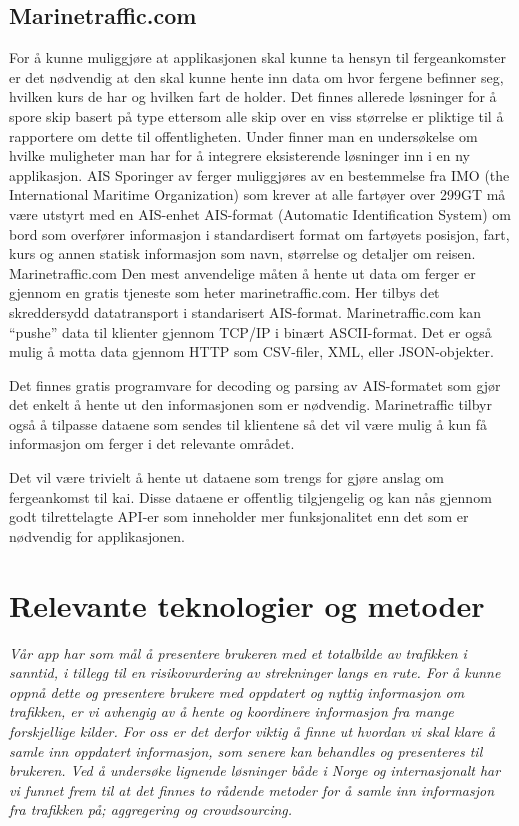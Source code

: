 \documentclass[a4paper,norsk,oneside]{book}
\begin{document}
\section{Marinetraffic.com}
For å kunne muliggjøre at applikasjonen skal kunne ta hensyn til fergeankomster er det nødvendig at den skal kunne hente inn data om hvor fergene befinner seg, hvilken kurs de har og hvilken fart de holder. Det finnes allerede løsninger for å spore skip basert på type ettersom alle skip over en viss størrelse er pliktige til å rapportere om dette til offentligheten. Under finner man en undersøkelse om hvilke muligheter man har for å integrere eksisterende løsninger inn i en ny applikasjon.
AIS
Sporinger av ferger muliggjøres av en bestemmelse fra IMO (the International Maritime Organization) som krever at alle fartøyer over 299GT må være utstyrt med en AIS-enhet AIS-format (Automatic Identification System) om bord som overfører informasjon i standardisert format om fartøyets posisjon, fart, kurs og annen statisk informasjon som navn, størrelse og detaljer om reisen.\cite{laws}
Marinetraffic.com
Den mest anvendelige måten å hente ut data om ferger er gjennom en gratis tjeneste som heter marinetraffic.com. Her tilbys det skreddersydd datatransport i standarisert AIS-format. Marinetraffic.com kan “pushe” data til klienter gjennom TCP/IP i binært ASCII-format. Det er også mulig å motta data gjennom HTTP som CSV-filer, XML, eller JSON-objekter. \cite{mar}

Det finnes gratis programvare for decoding og parsing av AIS-formatet som gjør det enkelt å hente ut den informasjonen som er nødvendig. Marinetraffic tilbyr også å tilpasse dataene som sendes til klientene så det vil være mulig å kun få informasjon om ferger i det relevante området.

Det vil være trivielt å hente ut dataene som trengs for gjøre anslag om fergeankomst til kai. Disse dataene er offentlig tilgjengelig og kan nås gjennom godt tilrettelagte API-er som inneholder mer funksjonalitet enn det som er nødvendig for applikasjonen.


\chapter{Relevante teknologier og metoder}
\label{cha:ResearchAndResults}

{\it Vår app har som mål å presentere brukeren med et totalbilde av trafikken i sanntid, i tillegg til en risikovurdering av strekninger langs en rute. For å kunne oppnå dette og presentere brukere med oppdatert og nyttig informasjon om trafikken, er vi avhengig av å hente og koordinere informasjon fra mange forskjellige kilder. For oss er det derfor viktig å finne ut hvordan vi skal klare å samle inn oppdatert informasjon, som senere kan behandles og presenteres til brukeren. Ved å undersøke lignende løsninger både i Norge og internasjonalt har vi funnet frem til at det finnes to rådende metoder for å samle inn informasjon fra trafikken på; aggregering og crowdsourcing. }
\end{document}
